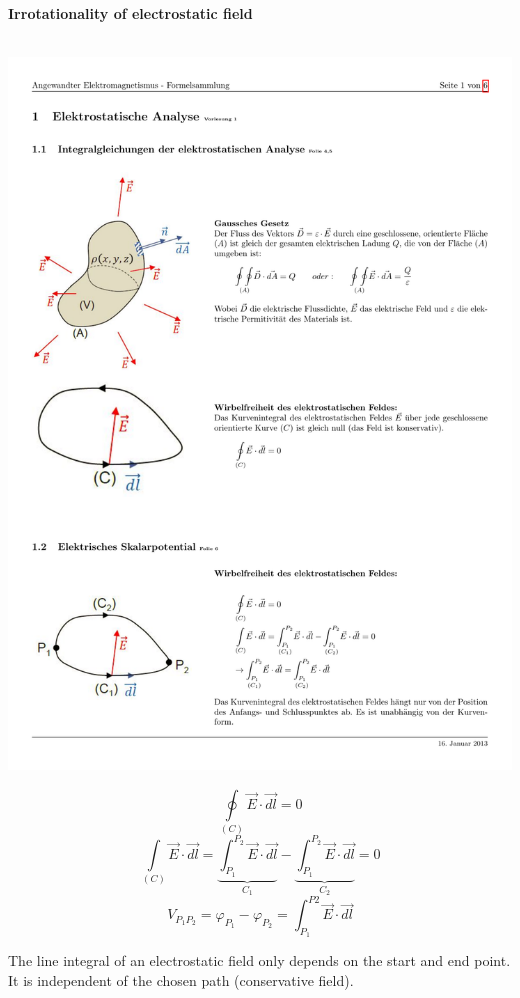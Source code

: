 \textbf{\\ \\ Irrotationality of electrostatic field \\ \\}
\begin{minipage}[lt]{5cm}
	\includegraphics[width=.8\textwidth]{./images/WirbelfreiE.pdf}
\end{minipage}
\begin{minipage}[rt]{14cm}
	\begin{equation*}
		\oint \limits_{\left(C\right)} \vec{E}\cdot \vec{dl} = 0
	\end{equation*}
	\begin{equation*}
		\int\limits_{\left(C\right)} \vec{E} \cdot \vec{dl} = \underbrace{\int_{P_1}^{P_2} \vec{E} \cdot \vec{dl}}_{C_1} - \underbrace{\int_{P_1}^{P_2} \vec{E} \cdot \vec{dl}}_{C_2} = 0
	\end{equation*}
	\begin{equation*}
		V_{P_1P_2} = \varphi_{P_1} - \varphi_{P_2} = \int_{P_1}^{P2} \vec{E} \cdot \vec{dl}
	\end{equation*}
\end{minipage}
The line integral of an electrostatic field only depends on the start and end point. It is independent of the chosen path (conservative field).

